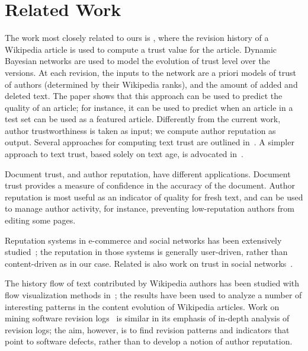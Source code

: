 \section{Related Work}

The work most closely related to ours is \cite{Zeng2006}, where the
revision history of a Wikipedia article is used to compute a trust
value for the article.
Dynamic Bayesian networks are used to model the
evolution of trust level over the versions. 
At each revision, the inputs to the network are a priori models of
trust of authors (determined by their Wikipedia ranks), 
and the amount of added and deleted text. 
The paper shows that this approach can be used to predict the quality
of an article; for instance, it can be used to predict when an article
in a test set can be used as a featured article.  
Differently from the current work, author trustworthiness is
taken as input; we compute author reputation as output. 
Several approaches for computing text trust are outlined
in~\cite{WikiMTWtrust06}. 
A simpler approach to text trust, based solely on text age, is
advocated in~\cite{Cross2006}. 

Document trust, and author reputation, have different applications. 
Document trust provides a measure of confidence in the accuracy of the
document. 
Author reputation is most useful as an indicator of quality
for fresh text, and can be used to manage author activity, for
instance, preventing low-reputation authors from editing some pages. 

Reputation systems in e-commerce and social networks has been extensively
studied~\cite{Kleinberg1999,Resnick2000,Dellarocas2003,Kamvar2003};
the reputation in those systems is generally user-driven, rather than
content-driven as in our case. 
Related is also work on trust in social networks~\cite{Guha2004,Golbeck2005}. 

The history flow of text contributed by Wikipedia authors has
been studied with flow visualization methods in~\cite{Viegas2004}; 
the results have been used to analyze a number of interesting patterns
in the content evolution of Wikipedia articles. 
Work on mining software revision logs~\cite{Livshits2005}
is similar in its emphasis of in-depth analysis of revision logs; the
aim, however, is to find revision patterns and indicators that point
to software defects, rather than to develop a notion of author
reputation. 

